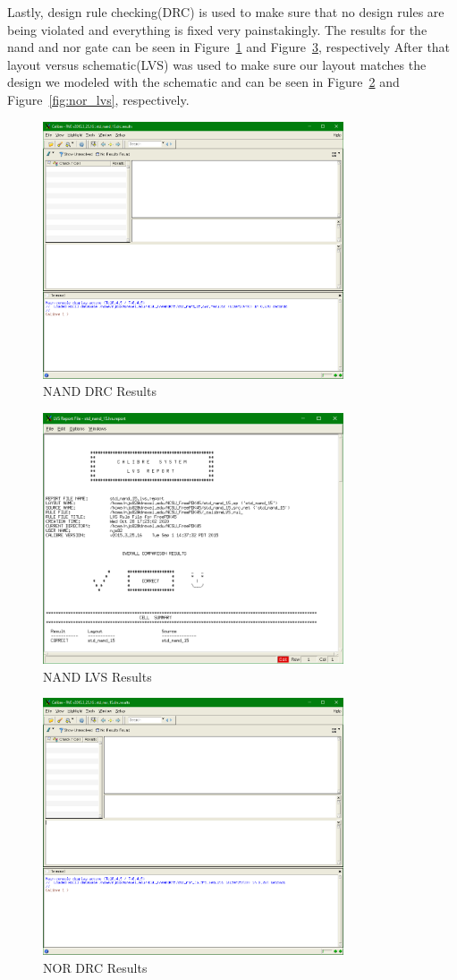 \documentclass[12pt]{article}
\begin{document}
Lastly, design rule checking(DRC) is used to make sure that no design rules are being violated and everything is fixed very painstakingly. The results for the nand and nor gate can
be seen in Figure~\ref{fig:nand_drc} and Figure~\ref{fig:nor_drc}, respectively  After that layout versus schematic(LVS) was used to make sure our layout matches
the design we modeled with the schematic and can be seen in Figure~\ref{fig:nand_lvs} and Figure~\ref{fig:nor_lvs}, respectively.
\begin{figure}[!htb]
  \centering
  \includegraphics[width=3.5in]{figures/nand/nand_drc.png}
  \caption{NAND DRC Results}\label{fig:nand_drc}
\end{figure}
\begin{figure}[!htb]
  \centering
  \includegraphics[width=3.5in]{figures/nand/nand_lvs.png}
  \caption{NAND LVS Results}\label{fig:nand_lvs}
\end{figure}
\begin{figure}[!htb]
  \centering
  \includegraphics[width=3.5in]{figures/nor/nor_drc.png}
  \caption{NOR DRC Results}\label{fig:nor_drc}
\end{figure}
\end{document}
